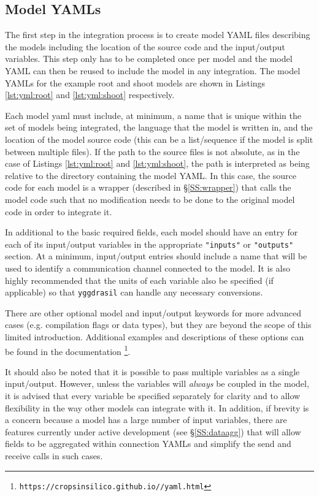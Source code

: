\documentclass[journal]{IEEEtran}
\newcommand{\todo}[1]{{\color{red}{#1}}}
\newcommand{\pkg}{{\tt yggdrasil}{}}
\newcommand{\pkglink}{\todo{cis\_interface}}
\newcommand{\rootyml}{}
\newcommand{\shootyml}{}
\begin{document}
\subsection{Model YAMLs}\label{SS:model_yaml}
%
The first step in the integration process is to create model YAML files describing the models including the location of the source code and the input/output variables. This step only has to be completed once per model and the model YAML can then be reused to include the model in any integration. The model YAMLs for the example root and shoot models are shown in Listings \ref{lst:yml:root} and \ref{lst:yml:shoot} respectively.
%
\rootyml
%
\shootyml
%
Each model yaml must include, at minimum, a name that is unique within the set of models being integrated, the language that the model is written in, and the location of the model source code (this can be a list/sequence if the model is split between multiple files). If the path to the source files is not absolute, as in the case of Listings \ref{lst:yml:root} and \ref{lst:yml:shoot}, the path is interpreted as being relative to the directory containing the model YAML. In this case, the source code for each model is a wrapper (described in \S\ref{SS:wrapper}) that calls the model code such that no modification needs to be done to the original model code in order to integrate it.

In additional to the basic required fields, each model should have an entry for each of its input/output variables in the appropriate {\tt "inputs"} or {\tt "outputs"} section. At a minimum, input/output entries should include a name that will be used to identify a communication channel connected to the model. It is also highly recommended that the units of each variable also be specified (if applicable) so that {\pkg} can handle any necessary conversions.

There are other optional model and input/output keywords for more advanced cases (e.g. compilation flags or data types), but they are beyond the scope of this limited introduction. Additional examples and descriptions of these options can be found in the documentation \footnote{{\tt https://cropsinsilico.github.io/\pkglink/yaml.html}}.

It should also be noted that it is possible to pass multiple variables as a single input/output. However, unless the variables will \emph{always} be coupled in the model, it is advised that every variable be specified separately for clarity and to allow flexibility in the way other models can integrate with it. In addition, if brevity is a concern because a model has a large number of input variables, there are features currently under active development (see \S\ref{SS:dataagg}) that will allow fields to be aggregated within connection YAMLs and simplify the send and receive calls in such cases.
\end{document}
